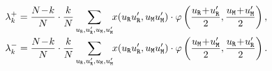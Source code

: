 \documentclass[11pt]{article}
\def\resident{\texttt{R}}
\def\mutant{\texttt{M}}
\theoremstyle{plainCl1}
\theoremstyle{plainCl2}
\begin{document}
\begin{equation}\label{eq:ratio_TwoRounds}
\begin{array}{l}
\displaystyle \lambda^+_k=\frac{N\!-\!k}{N}\cdot \frac{k}{N} \sum_{u_{\resident},u_\resident',u_{\mutant},u_\mutant'} \hspace{-0.1cm} x(u_\resident u_\resident', u_\mutant u_\mutant')\cdot \varphi\left(\frac{u_\resident \!+\! u_\resident'}{2}, \frac{u_\mutant \!+\! u_\mutant '}{2}\right), \\[0.5cm]
\displaystyle \lambda^-_k=\frac{N\!-\!k}{N}\cdot \frac{k}{N} \sum_{u_{\resident},u_\resident',u_{\mutant},u_\mutant'} \hspace{-0.1cm} x(u_\resident u_\resident', u_\mutant u_\mutant')\cdot \varphi\left( \frac{u_\mutant \!+\! u_\mutant '}{2}, \frac{u_\resident \!+\! u_\resident'}{2}\right).
\end{array}
\end{equation}
 
\end{document}
